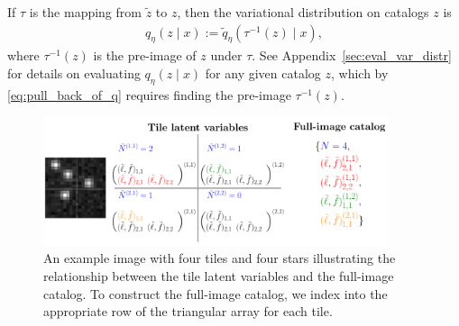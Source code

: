 If $\tau$ is the mapping from $\tilde z$ to $z$,
then the variational distribution on catalogs $z$ is
\begin{align}
    q_\eta(z \mid x) := \tilde q_\eta(\tau^{-1}(z) \mid x),
    \label{eq:pull_back_of_q}
\end{align}
where $\tau^{-1}(z)$ is the pre-image of $z$ under $\tau$.
See Appendix~\ref{sec:eval_var_distr} for details on evaluating $q_\eta(z \mid x)$ for any given catalog $z$, which by \eqref{eq:pull_back_of_q} requires finding the pre-image $\tau^{-1}(z)$.







\begin{figure}[tb]
    \centering
    \includegraphics[width = 0.9\textwidth]{figures/vi_figures/tile_to_full_schematic.png}
    \caption{An example image with four tiles and four stars illustrating the relationship between the tile latent variables and the full-image catalog.
    To construct the full-image catalog, we index into the appropriate row of the triangular array for each tile.}
    \label{fig:tile_to_full_schm}
\end{figure}


